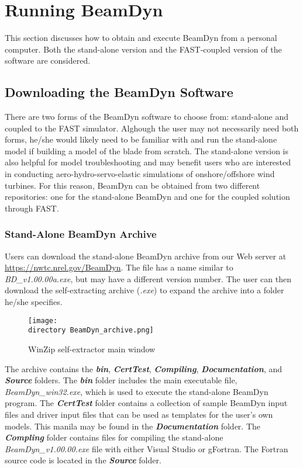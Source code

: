 \chapter{Running BeamDyn}
\label{sec:Run}
This section discusses how to obtain and execute BeamDyn from a personal computer. Both the stand-alone version and the FAST-coupled version of the software are considered.

\section{Downloading the BeamDyn Software}
There are two forms of the BeamDyn software to choose from: stand-alone and coupled to the FAST simulator. Alghough the user may not necessarily need both forms, he/she would likely need to be familiar with and run the stand-alone model if building a model of the blade from scratch. The stand-alone version is also helpful for model troubleshooting and may benefit users who are interested in conducting aero-hydro-servo-elastic simulations of onshore/offshore wind turbines. For this reason, BeamDyn can be obtained from two different repositories: one for the stand-alone BeamDyn and one for the coupled solution through FAST.

\subsection{Stand-Alone BeamDyn Archive}
Users can download the stand-alone BeamDyn archive from our Web server at \url{https://nwtc.nrel.gov/BeamDyn}. The file has a name similar to {\it BD\_v1.00.00a.exe}, but may have a different version number. The user can then download the self-extracting archive ({\it .exe}) to expand the archive into a folder he/she specifies.

\begin{figure}
    \centering
     \texttt{[image: \\directory BeamDyn\_archive.png]}
     \caption{WinZip self-extractor main window}
     \label{fig:BDSelfExtractor}
\end{figure}

The archive contains the \textbf{\textit{bin}}, \textbf{\textit{CertTest}}, \textbf{\textit{Compiling}}, \textbf{\textit{Documentation}}, and \textbf{\textit{Source}} folders. The \textbf{\textit{bin}} folder includes the main executable file, \textit{BeamDyn\_win32.exe}, which is used to execute the stand-alone BeamDyn program. The \textbf{\textit{CertTest}} folder contains a collection of sample BeamDyn input files and driver input files that can be used as templates for the user's own models. This manila may be found in the \textbf{\textit{Documentation}} folder. The \textbf{\textit{Compling}} folder contains files for compiling the stand-alone \textit{BeamDyn\_v1.00.00.exe} file with either Visual Studio or gFortran. The Fortran source code is located in the \textbf{\textit{Source}} folder.


